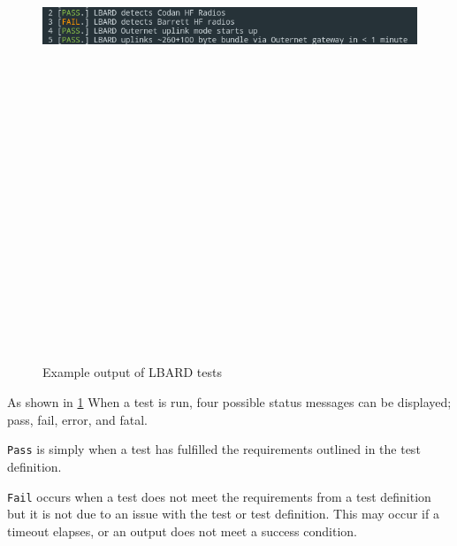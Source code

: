 \begin{figure}
    \begin{centering}
        \includegraphics[width=14cm,height=20cm,keepaspectratio]{Figures/testOutput1.png}
        \caption{Example output of LBARD tests}
        \label{fig:exampleTest}
    \end{centering}
\end{figure}


As shown in \figurename{ \ref{fig:exampleTest}} When a test is run, four possible status messages can be displayed; pass, fail, error, and fatal.

\verb|Pass| is simply when a test has fulfilled the requirements outlined in the test definition.

\verb|Fail| occurs when a test does not meet the requirements from a test definition but it is not due to an issue with the test or test definition. This may occur if a timeout elapses, or an output does not meet a success condition.

